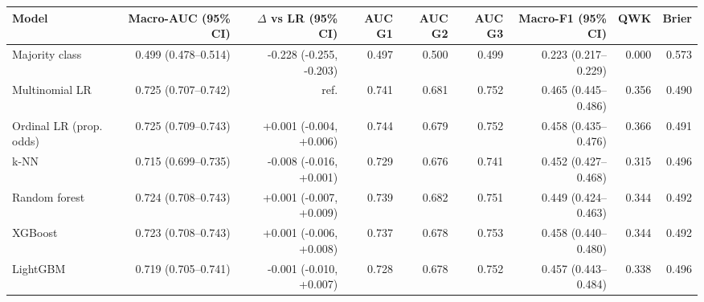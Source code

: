 \begin{tabular}{lrrrrrrrr}
\toprule
Model & Macro-AUC (95\% CI) & $\Delta$ vs LR (95\% CI) & AUC G1 & AUC G2 & AUC G3 & Macro-F1 (95\% CI) & QWK & Brier \\
\midrule
Majority class & 0.499 (0.478--0.514) & -0.228 (-0.255, -0.203) & 0.497 & 0.500 & 0.499 & 0.223 (0.217--0.229) & 0.000 & 0.573 \\
Multinomial LR & 0.725 (0.707--0.742) & ref. & 0.741 & 0.681 & 0.752 & 0.465 (0.445--0.486) & 0.356 & 0.490 \\
Ordinal LR (prop. odds) & 0.725 (0.709--0.743) & +0.001 (-0.004, +0.006) & 0.744 & 0.679 & 0.752 & 0.458 (0.435--0.476) & 0.366 & 0.491 \\
k-NN & 0.715 (0.699--0.735) & -0.008 (-0.016, +0.001) & 0.729 & 0.676 & 0.741 & 0.452 (0.427--0.468) & 0.315 & 0.496 \\
Random forest & 0.724 (0.708--0.743) & +0.001 (-0.007, +0.009) & 0.739 & 0.682 & 0.751 & 0.449 (0.424--0.463) & 0.344 & 0.492 \\
XGBoost & 0.723 (0.708--0.743) & +0.001 (-0.006, +0.008) & 0.737 & 0.678 & 0.753 & 0.458 (0.440--0.480) & 0.344 & 0.492 \\
LightGBM & 0.719 (0.705--0.741) & -0.001 (-0.010, +0.007) & 0.728 & 0.678 & 0.752 & 0.457 (0.443--0.484) & 0.338 & 0.496 \\
\bottomrule
\end{tabular}